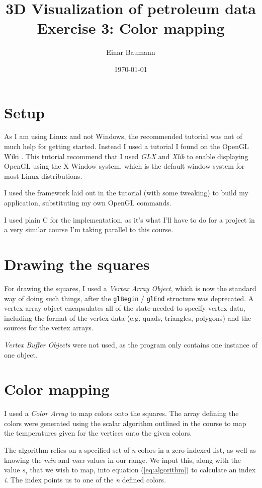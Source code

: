 \documentclass[a4paper, english, 12pt]{article}
\title{3D Visualization of petroleum data\\ 
\vspace{6pt}\large Exercise 3: Color mapping \\ 
 }
\author{Einar Baumann}
\date{\today}
\begin{document}
\maketitle
\thispagestyle{empty}
\pagebreak

\section{Setup}
\label{sec:setup}
As I am using Linux and not Windows, the recommended tutorial was not of much help for getting started. Instead I used a tutorial I found on the OpenGL Wiki \cite{gltutorial}. This tutorial recommend that I used \emph{GLX} and \emph{Xlib} to enable displaying OpenGL using the X Window system, which is the default window system for most Linux distributions.

I used the framework laid out in the tutorial (with some tweaking) to build my application, substituting my own OpenGL commands.

I used plain C for the implementation, as it's what I'll have to do for a project in a very similar course I'm taking parallel to this course.

\section{Drawing the squares}
\label{sec:drawing}
For drawing the squares, I used a \emph{Vertex Array Object}, which is now the standard way of doing such things, after the \texttt{glBegin} / \texttt{glEnd} structure was deprecated. A vertex array object encapsulates all of the state needed to specify vertex data, including the format of the vertex data (e.g. quads, triangles, polygons) and the sources for the vertex arrays.

\emph{Vertex Buffer Objects} were not used, as the program only contains one instance of one object. 

\section{Color mapping}
\label{sec:color_mapping}
I used a \emph{Color Array} to map colors onto the squares. The array defining the colors were generated using the scalar algorithm outlined in the course to map the temperatures given for the vertices onto the given colors.

The algorithm relies on a specified set of \emph{n} colors in a zero-indexed list, as well as knowing the \emph{min} and \emph{max} values in our range. We input this, along with the value $s_i$ that we wish to map, into equation (\ref{eq:algorithm}) to calculate an index \emph{i}. The index points us to one of the \emph{n} defined colors.
\end{document}
